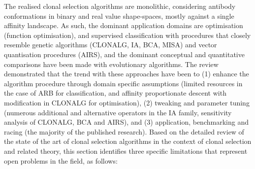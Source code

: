 The realised clonal selection algorithms are monolithic, considering antibody conformations in binary and real value shape-spaces, mostly against a single affinity landscape. As such, the dominant application domains are optimisation (function optimisation), and supervised classification with procedures that closely resemble genetic algorithms (CLONALG, IA, BCA, MISA) and vector quantisation procedures (AIRS), and the dominant conceptual and quantitative comparisons have been made with evolutionary algorithms. The review demonstrated that the trend with these approaches have been to (1) enhance the algorithm procedure through domain specific assumptions (limited resources in the case of ARB for classification, and affinity proportionate descent with modification in CLONALG for optimisation), (2) tweaking and parameter tuning (numerous additional and alternative operators in the IA family, sensitivity analysis of CLONALG, BCA and AIRS), and (3) application, benchmarking and racing (the majority of the published research).
Based on the detailed review of the state of the art of clonal selection algorithms in the context of clonal selection and related theory, this section identifies three specific limitations that represent open problems in the field, as follows:

